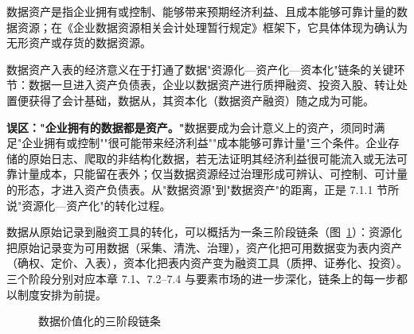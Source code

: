 \begin{definition}
数据资产是指企业拥有或控制、能够带来预期经济利益、且成本能够可靠计量的数据资源；在《企业数据资源相关会计处理暂行规定》框架下，它具体体现为确认为无形资产或存货的数据资源。
\end{definition}

数据资产入表的经济意义在于打通了数据"资源化—资产化—资本化"链条的关键环节：数据一旦进入资产负债表，企业以数据资产进行质押融资、投资入股、转让处置便获得了会计基础，数据从，其资本化（数据资产融资）随之成为可能。

\begin{misconception}
\textbf{误区："企业拥有的数据都是资产。"}数据要成为会计意义上的资产，须同时满足"企业拥有或控制""很可能带来经济利益""成本能够可靠计量"三个条件。企业存储的原始日志、爬取的非结构化数据，若无法证明其经济利益很可能流入或无法可靠计量成本，只能留在表外；仅当数据资源经过治理形成可辨认、可控制、可计量的形态，才进入资产负债表。从"数据资源"到"数据资产"的距离，正是 7.1.1 节所说"资源化—资产化"的转化过程。
\end{misconception}

数据从原始记录到融资工具的转化，可以概括为一条三阶段链条（图~\ref{fig:valuechain}）：资源化把原始记录变为可用数据（采集、清洗、治理），资产化把可用数据变为表内资产（确权、定价、入表），资本化把表内资产变为融资工具（质押、证券化、投资）。三个阶段分别对应本章 7.1、7.2--7.4 与要素市场的进一步深化，链条上的每一步都以制度安排为前提。

\begin{figure}[htbp]
\centering
{}
\caption{数据价值化的三阶段链条}
\label{fig:valuechain}
\end{figure}

